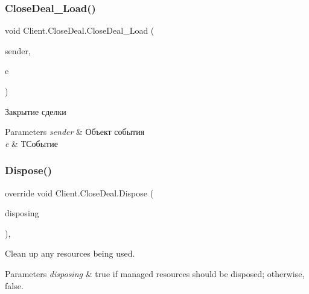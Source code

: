 \hypertarget{class_client_1_1_close_deal_a2693cd775d06cfc1a31b68523eac5b86}{}\label{class_client_1_1_close_deal_a2693cd775d06cfc1a31b68523eac5b86} 
\subsubsection{\texorpdfstring{Close\+Deal\+\_\+\+Load()}{CloseDeal\_Load()}}
{\footnotesize\ttfamily void Client.\+Close\+Deal.\+Close\+Deal\+\_\+\+Load (\begin{DoxyParamCaption}\item[{object}]{sender,  }\item[{Event\+Args}]{e }\end{DoxyParamCaption})\hspace{0.3cm}{\ttfamily [inline]}}



Закрытие сделки 
\begin{DoxyParams}{Parameters}
{\em sender} & Объект события\\
\hline
{\em e} & ТСобытие\\
\hline
\end{DoxyParams}


\hypertarget{class_client_1_1_close_deal_ac72c1f7f73882a1af7d84ec19ad56bc8}{}\label{class_client_1_1_close_deal_ac72c1f7f73882a1af7d84ec19ad56bc8} 
\subsubsection{\texorpdfstring{Dispose()}{Dispose()}}
{\footnotesize\ttfamily override void Client.\+Close\+Deal.\+Dispose (\begin{DoxyParamCaption}\item[{bool}]{disposing }\end{DoxyParamCaption})\hspace{0.3cm}{\ttfamily [inline]}, {\ttfamily [protected]}}



Clean up any resources being used. 


\begin{DoxyParams}{Parameters}
{\em disposing} & true if managed resources should be disposed; otherwise, false.\\
\hline
\end{DoxyParams}
\hypertarget{class_client_1_1_close_deal_a540ae3b166b32a9957fc86d27f39dbd1}{}\label{class_client_1_1_close_deal_a540ae3b166b32a9957fc86d27f39dbd1} 
